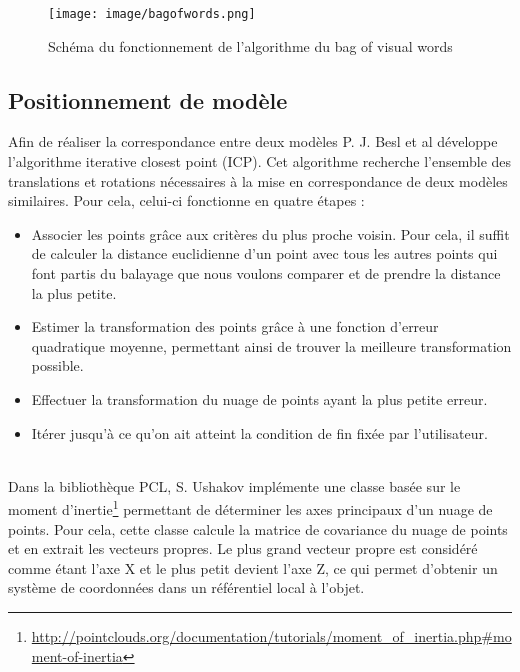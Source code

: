 \begin{figure}[!ht]
  \begin{center}
    \texttt{[image: image/bagofwords.png]}
    \caption[The LOF caption]{Schéma du fonctionnement de l'algorithme du bag of visual words\footnotemark }
  \end{center}
\end{figure}

\subsection{Positionnement de modèle}
Afin de réaliser la correspondance entre deux modèles P. J. Besl et al\cite{ICP} développe l'algorithme \og iterative closest point \fg (ICP).
Cet algorithme recherche l'ensemble des translations et rotations nécessaires à la mise en correspondance de deux modèles similaires. Pour cela,
celui-ci fonctionne en quatre étapes :
\begin{itemize}
  \item Associer les points grâce aux critères du plus proche voisin. Pour cela, il suffit de calculer la distance euclidienne d'un
   point avec tous les autres points qui font partis du balayage que nous voulons comparer et de prendre la distance la plus petite.
  \item Estimer la transformation des points grâce à une fonction d'erreur quadratique moyenne, permettant ainsi de trouver la meilleure
  transformation possible.
  \item Effectuer la transformation du nuage de points ayant la plus petite erreur.
  \item Itérer jusqu'à ce qu'on ait atteint la condition de fin fixée par l'utilisateur.
\end{itemize}
\ \\
Dans la bibliothèque PCL\cite{PCL}, S. Ushakov implémente une classe basée sur le moment d'inertie\footnote{\url{http://pointclouds.org/documentation/tutorials/moment\_of\_inertia.php\#moment-of-inertia}}
permettant de déterminer les axes principaux d'un nuage de points. Pour cela, cette classe calcule la matrice de covariance du nuage de points et 
en extrait les vecteurs propres. Le plus grand vecteur propre est considéré comme étant l'axe X et le plus petit devient l'axe Z, ce qui permet 
d'obtenir un système de coordonnées dans un référentiel local à l'objet.\\   
